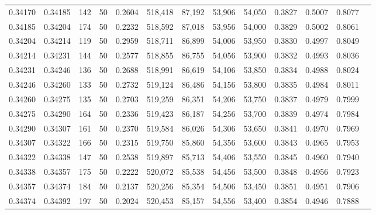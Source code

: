 \begin{tabular}{rrrrrrrrrrrrr}
0.34170 & 0.34185 &   142 &  50 &                                     0.2604 & 518,418 &  87,192 &  53,906 &  54,050 & 0.3827 & 0.5007 & 0.8077 \\
0.34185 & 0.34204 &   174 &  50 &                                     0.2232 & 518,592 &  87,018 &  53,956 &  54,000 & 0.3829 & 0.5002 & 0.8061 \\
0.34204 & 0.34214 &   119 &  50 &                                     0.2959 & 518,711 &  86,899 &  54,006 &  53,950 & 0.3830 & 0.4997 & 0.8049 \\
0.34214 & 0.34231 &   144 &  50 &                                     0.2577 & 518,855 &  86,755 &  54,056 &  53,900 & 0.3832 & 0.4993 & 0.8036 \\
0.34231 & 0.34246 &   136 &  50 &                                     0.2688 & 518,991 &  86,619 &  54,106 &  53,850 & 0.3834 & 0.4988 & 0.8024 \\
0.34246 & 0.34260 &   133 &  50 &                                     0.2732 & 519,124 &  86,486 &  54,156 &  53,800 & 0.3835 & 0.4984 & 0.8011 \\
0.34260 & 0.34275 &   135 &  50 &                                     0.2703 & 519,259 &  86,351 &  54,206 &  53,750 & 0.3837 & 0.4979 & 0.7999 \\
0.34275 & 0.34290 &   164 &  50 &                                     0.2336 & 519,423 &  86,187 &  54,256 &  53,700 & 0.3839 & 0.4974 & 0.7984 \\
0.34290 & 0.34307 &   161 &  50 &                                     0.2370 & 519,584 &  86,026 &  54,306 &  53,650 & 0.3841 & 0.4970 & 0.7969 \\
0.34307 & 0.34322 &   166 &  50 &                                     0.2315 & 519,750 &  85,860 &  54,356 &  53,600 & 0.3843 & 0.4965 & 0.7953 \\
0.34322 & 0.34338 &   147 &  50 &                                     0.2538 & 519,897 &  85,713 &  54,406 &  53,550 & 0.3845 & 0.4960 & 0.7940 \\
0.34338 & 0.34357 &   175 &  50 &                                     0.2222 & 520,072 &  85,538 &  54,456 &  53,500 & 0.3848 & 0.4956 & 0.7923 \\
0.34357 & 0.34374 &   184 &  50 &                                     0.2137 & 520,256 &  85,354 &  54,506 &  53,450 & 0.3851 & 0.4951 & 0.7906 \\
0.34374 & 0.34392 &   197 &  50 &                                     0.2024 & 520,453 &  85,157 &  54,556 &  53,400 & 0.3854 & 0.4946 & 0.7888 \\

\end{tabular}
